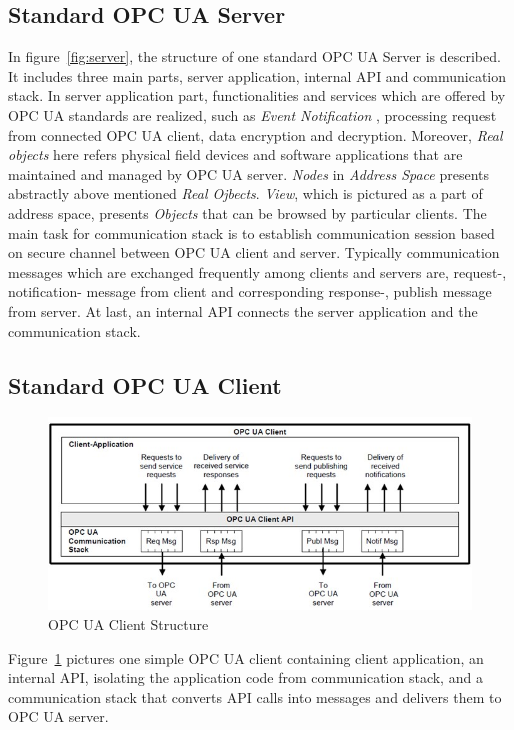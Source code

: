 \subsection{Standard OPC UA Server}
In figure~\ref{fig:server}, the structure of one standard OPC UA Server is described. It includes three main parts, server application, internal API and communication stack. In server application part,  functionalities and services which are offered by OPC UA standards are realized, such as \emph{Event Notification} , processing request from connected OPC UA client, data encryption and decryption. Moreover, \emph{Real objects}  here  refers physical field devices and software applications that are maintained and managed by OPC UA server. \emph{Nodes} in \emph{Address Space} presents  abstractly above mentioned \emph{Real Ojbects}. \emph{View}, which is pictured as a part of address space, presents \emph{Objects} that can be browsed by particular clients. The main  task for communication stack  is to establish communication session based on secure channel between OPC UA client and server. Typically communication messages which are exchanged frequently among clients and servers are, request-, notification- message from client and   corresponding   response-, publish message from server. At last, an internal API connects the server application and the communication stack.

\subsection{Standard OPC UA Client}
\begin{figure}[!htbp]
	\centering
	\includegraphics[width=1.0\textwidth]{client.jpg}
		\caption{OPC UA Client Structure\cite{O1}}
	\label{fig:client}
\end{figure}

Figure~\ref{fig:client} pictures one simple OPC UA client containing client application, an internal API, isolating the application code from communication stack, and a communication stack that converts API calls into messages and delivers them to OPC UA server.

